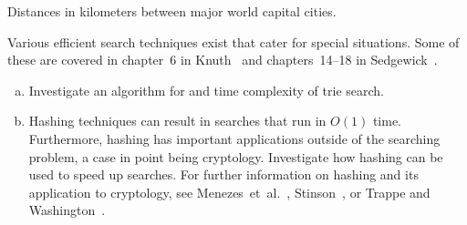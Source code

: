 \begin{problem}
\begin{landscape}
\begin{table}[!htbp]
\centering
{}
{\tiny

}
\caption{Distances in kilometers between major world capital cities.}
\label{tab:graph_algorithms:capital_cities_distance}
\end{table}
\end{landscape}

\item Various efficient search techniques exist that cater for special
  situations. Some of these are covered in chapter~6 in
  Knuth~\cite{Knuth1998c} and chapters~14--18 in
  Sedgewick~\cite{Sedgewick1990}.
  \begin{enumerate}[(a)]
  \item Investigate an algorithm for and time complexity of trie
    search.

  \item Hashing techniques can result in searches that run in $O(1)$
    time. Furthermore, hashing has important applications outside of the
    searching problem, a case in point being cryptology. Investigate how
    hashing can be used to speed up searches. For further information
    on hashing and its application to cryptology, see
    Menezes~et~al.~\cite{MenezesEtAl1996}, Stinson~\cite{Stinson2002},
    or Trappe and Washington~\cite{TrappeWashington2006}.
  \end{enumerate}


\end{problem}
